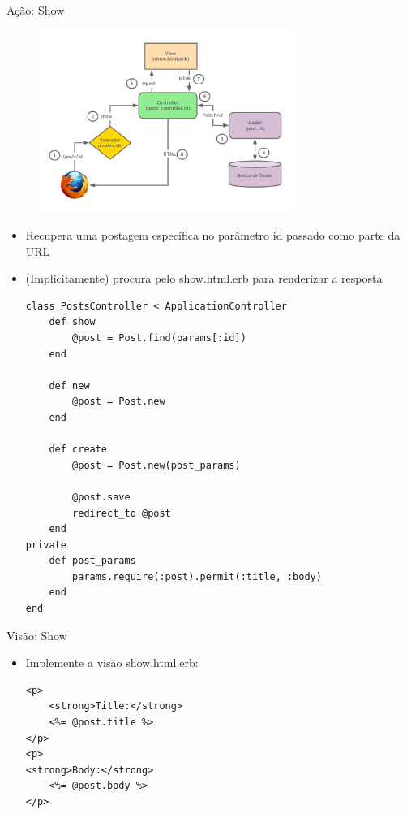 \begin{frame}{Ação: Show}
	\begin{figure}[h!]
		\centering
		\includegraphics[width=0.75\textwidth]{imagens/mvc-action-show.jpg}
	\end{figure}
	\framebreak
	\begin{itemize}
		\item Recupera \alert{uma} postagem específica no parâmetro \alert{id} passado como parte da URL
		\item (Implicitamente) procura pelo \alert{show.html.erb} para renderizar a resposta
		\begin{lstlisting}[style=RubyInputStyle, caption=controllers/posts\_controller.rb]
class PostsController < ApplicationController
	def show 
		@post = Post.find(params[:id])
	end

	def new
		@post = Post.new
	end

	def create 
		@post = Post.new(post_params)
		
		@post.save
		redirect_to @post
	end
private 
	def post_params 
		params.require(:post).permit(:title, :body)
	end
end
		\end{lstlisting}
	\end{itemize}	
\end{frame}

\begin{frame}{Visão: Show}
	\begin{itemize}
		\item Implemente a visão \alert{show.html.erb}:
		\begin{lstlisting}[style=RubyInputStyle, caption=views/posts/show.html.erb]
<p>
	<strong>Title:</strong>
	<%= @post.title %>
</p>
<p>
<strong>Body:</strong>
	<%= @post.body %>
</p>
		\end{lstlisting}		
	\end{itemize}	
\end{frame}